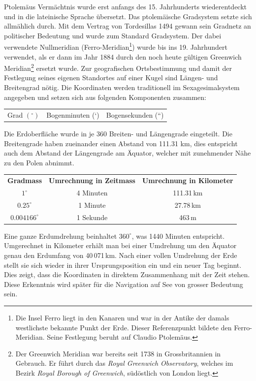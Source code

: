 \begin{refsection}
Ptolemäus Vermächtnis wurde erst anfangs des 15. Jahrhunderts
wiederentdeckt und in die lateinische Sprache übersetzt. Das
ptolemäische Gradsystem setzte sich allmählich durch.
Mit dem Vertrag von Tordesillas 1494 gewann sein Gradnetz an
politischer Bedeutung und wurde zum Standard Gradsystem. Der dabei
verwendete Nullmeridian (Ferro-Meridian\footnote{%
Die Insel Ferro liegt in den Kanaren und war in der Antike der
damals westlichste bekannte Punkt der Erde. Dieser Referenzpunkt
bildete den Ferro-Meridian. Seine Festlegung beruht auf Claudio
Ptolemäus.}) wurde bis ins 19. Jahrhundert verwendet, als er dann
im Jahr 1884 durch den noch heute gültigen Greenwich Meridian\footnote{%
Der Greenwich Meridian war bereits seit 1738 in Grossbritannien in
Gebrauch. Er führt durch das {\em Royal Greenwich Observatory},
welches im Bezirk {\em Royal Borough of Greenwich}, südöstlich von
London liegt.}
ersetzt wurde.
%
%
%
%
Zur geografischen Ortsbestimmung und damit der Festlegung seines
eigenen Standortes auf einer Kugel sind Längen- und Breitengrad
nötig.
Die Koordinaten werden traditionell im Sexagesimalsystem angegeben
und setzen sich aus folgenden Komponenten zusammen:
\begin{center}
\renewcommand{\arraystretch}{1.5}
\begin{tabular}{ccc}
Grad $(^{\circ})$ & Bogenminuten (`) & Bogensekunden (``)
\end{tabular}
\end{center}

Die Erdoberfläche wurde in je 360 Breiten- und Längengrade eingeteilt.
Die Breitengrade haben zueinander einen Abstand von 111.31 km, dies
entspricht auch dem Abstand der Längengrade am Äquator, welcher mit
zunehmender Nähe zu den Polen abnimmt.
\begin{center}
\renewcommand{\arraystretch}{1.5}
\begin{tabular}{ccc}
\textbf{Gradmass} & \textbf{Umrechnung in Zeitmass} & \textbf{Umrechnung in Kilometer}  \\
$1^{\circ}$ & 4 Minuten & 111.31\,km \\
$0.25^{\circ}$ & 1 Minute & 27.78\,km \\
$0.004166^{\circ}$ & 1 Sekunde & 463\,m 
\label {V7}
\end{tabular}
\end{center}
 
Eine ganze Erdumdrehung beinhaltet $360 ^{\circ}$, was 1440 Minuten
entspricht. Umgerechnet in Kilometer erhält man bei einer Umdrehung
um den Äquator genau den Erdumfang von 40\,071\,km.
Nach einer vollen Umdrehung der Erde stellt sie sich wieder in ihrer
Ursprungsposition ein und ein neuer Tag beginnt. Dies zeigt, dass
die Koordinaten in direktem Zusammenhang mit der Zeit stehen. Diese
Erkenntnis wird später für die Navigation auf See von grosser
Bedeutung sein.



\end{refsection}
